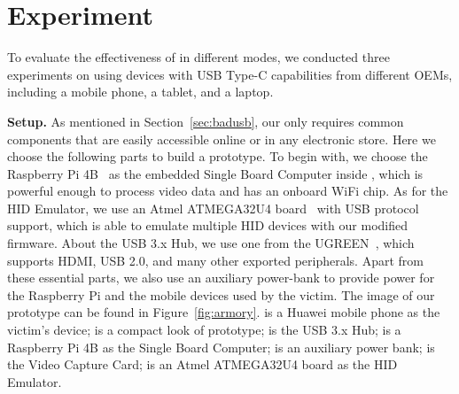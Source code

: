 \section{Experiment}
\label{sec:experiment}


To evaluate the effectiveness of \tool in different modes, we conducted three
experiments on \tool using devices with USB Type-C capabilities from different
OEMs, including a mobile phone, a tablet, and a laptop.

\textbf{Setup.}
As mentioned in Section~\ref{sec:badusb},
our \tool only requires common components that are easily accessible online or
in any electronic store. Here we choose the following parts to build a
prototype. To begin with, we choose the Raspberry Pi 4B~\cite{pi4b} as the embedded Single Board
Computer inside \tool, which is powerful enough to process video data and has
an onboard WiFi chip. As for the HID Emulator, we use an Atmel ATMEGA32U4 board~\cite{atmel}
with USB protocol support, which is able to emulate multiple HID devices
with our modified firmware. About the USB 3.x Hub, we use one from the
UGREEN~\cite{ugreen}, which supports HDMI, USB 2.0, and many other exported peripherals.
Apart from these essential parts, we also use an auxiliary power-bank to
provide power for the Raspberry Pi and the mobile devices used by the victim.
The image of our \tool prototype can be found in Figure~\ref{fig:armory}.
 is a Huawei mobile phone as the victim's device;  is a compact look of \tool prototype;  is the USB 3.x Hub;  is a Raspberry Pi 4B as the Single Board Computer;  is an auxiliary power bank;  is the Video Capture Card;  is an Atmel ATMEGA32U4 board as the HID Emulator.


